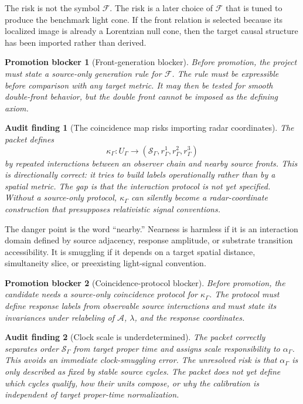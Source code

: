 \documentclass[11pt]{article}
\newcommand{\Sub}{\mathcal{A}}
\newcommand{\Front}{\mathcal{F}}
\newcommand{\Order}{\mathcal{S}}
\newtheorem{auditfinding}{Audit finding}
\newtheorem{blocker}{Promotion blocker}
\begin{document}
The risk is not the symbol \(\Front\). The risk is a later choice of \(\Front\)
that is tuned to produce the benchmark light cone. If the front relation is
selected because its localized image is already a Lorentzian null cone, then
the target causal structure has been imported rather than derived.

\begin{blocker}[Front-generation blocker]
Before promotion, the project must state a source-only generation rule for
\(\Front\). The rule must be expressible before comparison with any target
metric. It may then be tested for smooth double-front behavior, but the double
front cannot be imposed as the defining axiom.
\end{blocker}

\begin{auditfinding}[The coincidence map risks importing radar coordinates]
The packet defines
\[
\kappa_{\Gamma}:U_{\Gamma}\rightarrow
(\Order_{\Gamma},r^1_{\Gamma},r^2_{\Gamma},r^3_{\Gamma})
\]
by repeated interactions between an observer chain and nearby source fronts.
This is directionally correct: it tries to build labels operationally rather
than by a spatial metric. The gap is that the interaction protocol is not yet
specified. Without a source-only protocol, \(\kappa_{\Gamma}\) can silently
become a radar-coordinate construction that presupposes relativistic signal
conventions.
\end{auditfinding}

The danger point is the word ``nearby.'' Nearness is harmless if it is an
interaction domain defined by source adjacency, response amplitude, or
substrate transition accessibility. It is smuggling if it depends on a target
spatial distance, simultaneity slice, or preexisting light-signal convention.

\begin{blocker}[Coincidence-protocol blocker]
Before promotion, the candidate needs a source-only coincidence protocol for
\(\kappa_{\Gamma}\). The protocol must define response labels from observable
source interactions and must state its invariances under relabeling of
\(\Sub\), \(\lambda\), and the response coordinates.
\end{blocker}

\begin{auditfinding}[Clock scale is underdetermined]
The packet correctly separates order \(\Order_{\Gamma}\) from target proper
time and assigns scale responsibility to \(\alpha_{\Gamma}\). This avoids an
immediate clock-smuggling error. The unresolved risk is that
\(\alpha_{\Gamma}\) is only described as fixed by stable source cycles. The
packet does not yet define which cycles qualify, how their units compose, or
why the calibration is independent of target proper-time normalization.
\end{auditfinding}
\end{document}
